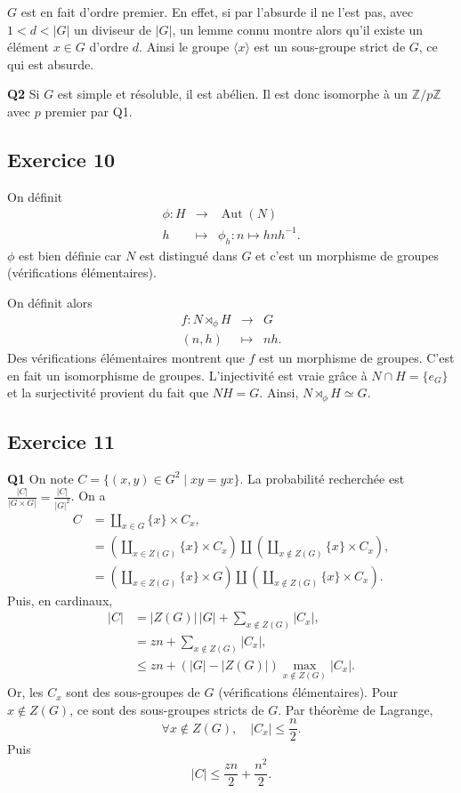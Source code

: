 \documentclass[11pt,a4paper]{article}
\newcommand{\semi}{\rtimes}
\begin{document}
$G$ est en fait d'ordre premier. En effet, si par l'absurde il ne l'est pas, avec $1<d<|G|$ un diviseur de $|G|$, un lemme connu montre alors qu'il existe un élément $x\in G$ d'ordre $d$. Ainsi le groupe $\langle x\rangle$ est un sous-groupe strict de $G$, ce qui est absurde.

\textbf{Q2} Si $G$ est simple et résoluble, il est abélien. Il est donc isomorphe à un $\mathbb Z/p\mathbb Z$ avec $p$ premier par Q1.

\subsection*{Exercice 10}
On définit
\[
\begin{array}{rcl}
\phi:H&\longrightarrow&\operatorname{Aut}(N)\\
h&\longmapsto&\phi_h:n\mapsto hnh^{-1}.
\end{array}
\]
$\phi$ est bien définie car $N$ est distingué dans $G$ et c'est un morphisme de groupes (vérifications élémentaires).

On définit alors
\[
\begin{array}{rcl}
f:N\semi_{\phi}H&\longrightarrow&G\\
(n,h)&\longmapsto&nh.
\end{array}
\]
Des vérifications élémentaires montrent que $f$ est un morphisme de groupes. C'est en fait un isomorphisme de groupes. L'injectivité est vraie grâce à $N\cap H=\{e_G\}$ et la surjectivité provient du fait que $NH=G$. Ainsi, $N\semi_{\phi}H\simeq G$.

\subsection*{Exercice 11}
\textbf{Q1} On note $C=\{(x,y)\in G^2\mid xy=yx\}$. La probabilité recherchée est $\frac{|C|}{|G\times G|}=\frac{|C|}{|G|^2}$. On a
\begin{align}
C&=\coprod_{x\in G}\{x\}\times C_x,\\
 &=\left(\coprod_{x\in Z(G)}\{x\}\times C_x\right)\coprod
 \left(\coprod_{x\notin Z(G)}\{x\}\times C_x\right),\\
 &=\left(\coprod_{x\in Z(G)}\{x\}\times G\right)\coprod
 \left(\coprod_{x\notin Z(G)}\{x\}\times C_x\right).
\end{align}
Puis, en cardinaux,
\begin{align}
|C|&=|Z(G)|\,|G|+\sum_{x\notin Z(G)}|C_x|,\\
 &=zn+\sum_{x\notin Z(G)}|C_x|,\\
 &\leq zn+(|G|-|Z(G)|)\max_{x\notin Z(G)}|C_x|.
\end{align}
Or, les $C_x$ sont des sous-groupes de $G$ (vérifications élémentaires). Pour $x\notin Z(G)$, ce sont des sous-groupes stricts de $G$. Par théorème de Lagrange,
\[
\forall x\notin Z(G),\quad |C_x|\leq\frac n2.
\]
Puis
\[
|C|\leq\frac{zn}{2}+\frac{n^2}{2}.
\]
\end{document}
